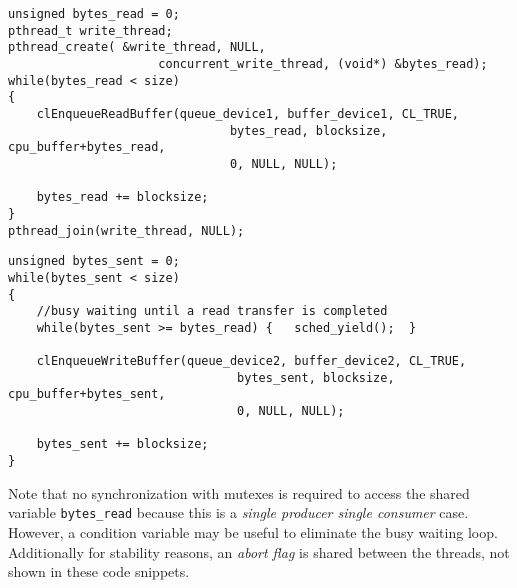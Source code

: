 \newpage

\begin{lstlisting}[label=concurrent_read_thread,morekeywords={}, caption= First thread for concurrent device to device transfer]
unsigned bytes_read = 0;
pthread_t write_thread;
pthread_create( &write_thread, NULL,
                     concurrent_write_thread, (void*) &bytes_read);
while(bytes_read < size)
{
	clEnqueueReadBuffer(queue_device1, buffer_device1, CL_TRUE,
	                           bytes_read, blocksize, cpu_buffer+bytes_read,
	                           0, NULL, NULL);
	
	bytes_read += blocksize;
}
pthread_join(write_thread, NULL);
\end{lstlisting}


\begin{lstlisting}[label=concurrent_write_thread,morekeywords={bytes_read}, caption= Second thread for concurrent device to device transfer]
unsigned bytes_sent = 0;
while(bytes_sent < size)
{
	//busy waiting until a read transfer is completed
	while(bytes_sent >= bytes_read)	{	sched_yield();	}
	
	clEnqueueWriteBuffer(queue_device2, buffer_device2, CL_TRUE,
	                            bytes_sent, blocksize, cpu_buffer+bytes_sent,
	                            0, NULL, NULL);
	
	bytes_sent += blocksize;
}
\end{lstlisting}



Note that no synchronization with mutexes is required to access the shared  variable \texttt{bytes\_read} because this is a \emph{single producer single consumer} case.
However, a condition variable may be useful to eliminate the busy waiting loop.
Additionally for stability reasons, an \emph{abort flag} is shared between the threads, not shown in these code snippets.

